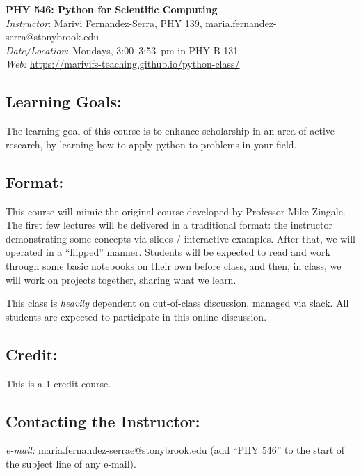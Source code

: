\documentclass[11pt]{article}
\begin{document}
\begin{center}
{\LARGE \sffamily \bfseries PHY 546: Python for Scientific Computing} \\[3mm]
{\em Instructor}\/: Marivi Fernandez-Serra, PHY 139, maria.fernandez-serra@stonybrook.edu \\
{\em Date/Location}\/: Mondays, 3:00--3:53~pm in PHY B-131  \\
{\em Web:}\/ \url{https://marivifs-teaching.github.io/python-class/}
\end{center}

\subsection*{Learning Goals:}

The learning goal of this course is to enhance scholarship in an area
of active research, by learning how to apply python to problems
in your field.


\subsection*{Format:}

This course will mimic the original course developed by Professor
Mike Zingale.
The first few lectures will be delivered in a traditional format: the
instructor demonstrating some concepts via slides / interactive
examples.  After that, we will operated in a ``flipped'' manner.
Students will be expected to read and work through some basic
notebooks on their own before class, and then, in class, we will work
on projects together, sharing what we learn.

This class is {\em heavily} dependent on out-of-class discussion,
managed via slack.  All students are expected to participate in this
online discussion.

\subsection*{Credit:}

This is a 1-credit course.


\subsection*{Contacting the Instructor:}

{\em e-mail:} maria.fernandez-serrae@stonybrook.edu ({add ``PHY 546'' to the
 start of the subject line of any e-mail}).
%
\end{document}
